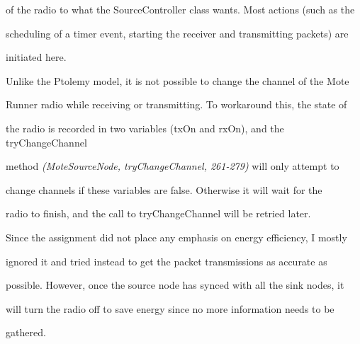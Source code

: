\documentclass[a4paper,12pt,DIV=calc]{scrartcl}
\newcommand{\coderef}[3]{\emph{(#1, #2, #3)}}
\begin{document}
of the radio to what the SourceController class wants. Most actions (such as the

scheduling of a timer event, starting the receiver and transmitting packets) are

initiated here.



Unlike the Ptolemy model, it is not possible to change the channel of the Mote

Runner radio while receiving or transmitting. To workaround this, the state of

the radio is recorded in two variables (txOn and rxOn), and the tryChangeChannel

method \coderef{MoteSourceNode}{tryChangeChannel}{261-279} will only attempt to

change channels if these variables are false. Otherwise it will wait for the

radio to finish, and the call to tryChangeChannel will be retried later.



Since the assignment did not place any emphasis on energy efficiency, I mostly

ignored it and tried instead to get the packet transmissions as accurate as

possible. However, once the source node has synced with all the sink nodes, it

will turn the radio off to save energy since no more information needs to be

gathered.
\end{document}
